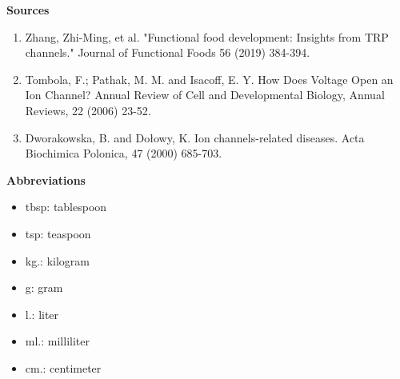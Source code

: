 \documentclass{article}
\begin{document}
\begin{spacing}{0.1}
\tableofcontents
\end{spacing}


\vfill
\bigskip
\textbf{Sources}
\begin{enumerate}
    \itemsep0em 
    \item Zhang, Zhi-Ming, et al. "Functional food development: Insights from TRP channels." Journal of Functional Foods 56 (2019) 384-394.
    \item Tombola, F.; Pathak, M. M. and Isacoff, E. Y. How Does Voltage Open an Ion Channel? Annual Review of Cell and Developmental Biology, Annual Reviews, 22 (2006) 23-52.
    \item Dworakowska, B. and Do\l{}owy, K. Ion channels-related diseases. Acta Biochimica Polonica, 47 (2000) 685-703.
\end{enumerate}

\vfill
\textbf{Abbreviations}

\begin{minipage}[t]{0.35\textwidth}
\begin{itemize}
    \setlength{\itemsep}{1pt}
    \setlength{\parskip}{1pt}
    \setlength{\parsep}{0pt}
    \item tbsp: tablespoon
    \item tsp: teaspoon
\end{itemize}
\end{minipage}
\begin{minipage}[t]{0.30\textwidth}
\begin{itemize}
    \setlength{\itemsep}{1pt}
    \setlength{\parskip}{0pt}
    \setlength{\parsep}{0pt}
    \item kg.: kilogram
    \item g: gram
\end{itemize}
\end{minipage}
\begin{minipage}[t]{0.3\textwidth}
\begin{itemize}
    \setlength{\itemsep}{1pt}
    \setlength{\parskip}{0pt}
    \setlength{\parsep}{0pt}
    \item l.: liter
    \item ml.: milliliter
    \item cm.: centimeter
\end{itemize}
\end{minipage}
\end{document}
